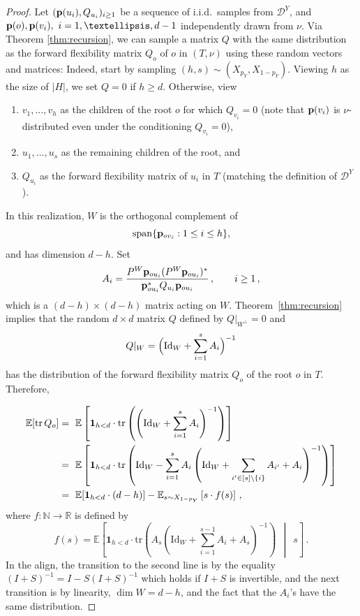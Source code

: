 \documentclass[10pt,a4paper]{amsart}
\numberwithin{equation}{section}
\newcommand{\E}{\mathbb E}
\newcommand{\N}{\mathbb N}
\newcommand{\R}{\mathbb R}
\newcommand{\cD}{\mathcal D}
\newcommand{\p}{{\bf p}}
\newcommand{\tr}{{\mathrm {tr}}}
\newcommand{\Id}{\mathrm{Id}}
\begin{document}
\begin{proof}
Let $(\p(u_i),Q_{u_i})_{i\ge 1}$ be a sequence of i.i.d.\ samples from $\cD^Y$, and $\p(o),\p(v_i),~i=1,\ldots,d-1$ independently drawn from $\nu$. Via Theorem \ref{thm:recursion}, we can sample a matrix $Q$ with the same distribution as the forward flexibility matrix $Q_o$ of $o$ in $(T,\nu)$
 using these random vectors and matrices: 
Indeed, start by sampling \((h,s)\sim (X_{p_Y},X_{1-p_Y})\).
Viewing \(h\) as the size of \(|H|\), we set \(Q=0\) if \(h\ge d\).
Otherwise, view
\begin{enumerate}
    \item[(i)] \(v_1,\ldots,v_h\) as the children of the root \(o\)
    for which \(Q_{v_i}=0\) (note that \(\p(v_i)\) is
    \(\nu\)-distributed even under the conditioning \(Q_{v_i}=0\)),
    \item[(ii)] \(u_1,\ldots,u_s\) as the remaining children of the root,
    and
    \item[(iii)] \(Q_{u_i}\) as the forward flexibility matrix of \(u_i\)
    in \(T\) (matching the definition of \(\cD^Y\)).
\end{enumerate}



In this realization, $W$ is the orthogonal complement of
\[
\mathrm{span}\{\p_{ov_i}: 1\le i\le h\},
\]
and has dimension $d-h$. Set 
\[
A_i=\frac{P^W\p_{ou_i}(P^W\p_{ou_i})^*}{\p_{ou_i}^*Q_{u_i}\p_{ou_i}}\,,\qquad i\ge 1\,,
\]
which is a $(d-h)\times(d-h)$ matrix acting on $W$. Theorem~\ref{thm:recursion} implies that the random $d\times d$ matrix $Q$ defined by $Q|_{W^\perp}=0$ and
\[
Q|_W=\Bigl(\Id_W+\sum_{i=1}^{s}A_i\Bigr)^{-1}
\]
has the distribution of the forward flexibility matrix $Q_o$ of the root $o$ in $T$.
Therefore,

\begin{align}
\notag 
\E[\tr\,Q_o] 
&=~ \E\left[ \mathbf 1_{h<d}\cdot \tr\left(\left(\Id_W + \sum_{i=1}^{s}A_i\right)^{-1}\right)\right] \\
\notag &=~ \E\left[\mathbf 1_{h<d}\cdot \tr\left(
\Id_W-\sum_{i=1}^{s}A_i \left(\Id_W + \sum_{i'\in[s]\setminus\{i\}}A_{i'} +A_i\right)^{-1}\right)\right] \\
\label{eq:first_stop} &=~ \E[\mathbf 1_{h<d}\cdot (d-h)] - \E_{s\sim X_{1-p_Y}}\left[ s\cdot f(s) \right]\,,
\end{align}
where $f:\N\to \R$ is defined by
\[
f(s) = 
\E\left[\mathbf{1}_{h<d}\cdot 
\tr\left(A_s \left(\Id_W + \sum_{i=1}^{s-1}A_i+A_s\right)^{-1}\right)
~~\middle |~~s\right]\,.
\]
In the align, the transition to the second line is by the equality $(I+S)^{-1}=I-S(I+S)^{-1}$ which holds if $I+S$ is invertible, and the next transition is by linearity, $\dim W=d-h$, and the fact that the $A_i$'s have the same distribution. 


\end{proof}
\end{document}
